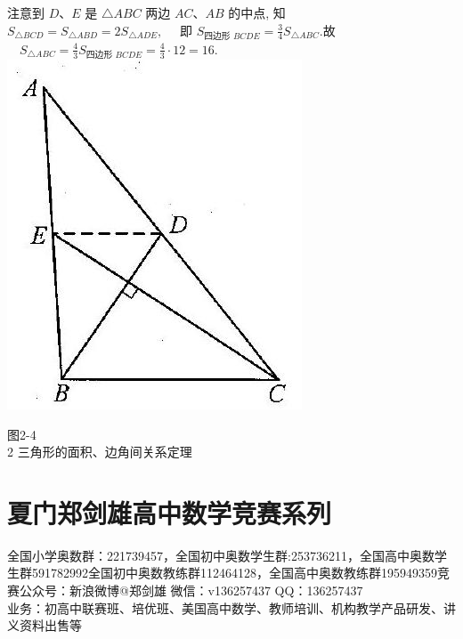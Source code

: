 \documentclass[10pt]{article}
\begin{document}
注意到 $D 、 E$ 是 $\triangle A B C$ 两边 $A C 、 A B$ 的中点, 知 $S_{\triangle B C D}=S_{\triangle A B D}=2 S_{\triangle A D E}, \quad$ 即 $S_{\text {四边形 } B C D E}=\frac{3}{4} S_{\triangle A B C}$.故 $\quad S_{\triangle A B C}=\frac{4}{3} S_{\text {四边形 } B C D E}=\frac{4}{3} \cdot 12=16$.\\
\includegraphics[max width=\textwidth, center]{2024_10_30_2c8f45efd4a519b08e1ag-017}

图2-4\\
2 三角形的面积、边角间关系定理

\section*{夏门郑剑雄高中数学竞赛系列}
全国小学奥数群：221739457，全国初中奥数学生群:253736211，全国高中奥数学生群591782992全国初中奥数教练群112464128，全国高中奥数教练群195949359竞赛公众号：新浪微博@郑剑雄 微信：v136257437 QQ：136257437\\
业务：初高中联赛班、培优班、美国高中数学、教师培训、机构教学产品研发、讲义资料出售等
\end{document}
